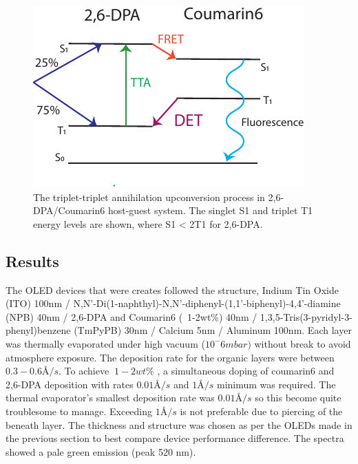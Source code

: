 \documentclass[
  letterpaper,
  DIV=11,
  numbers=noendperiod,
  oneside]{scrreprt}
\begin{document}
\begin{figure}

{\centering \includegraphics{./images/coumarinTTU.pdf}

}

\caption{\label{fig-ttucoumarin}The triplet-triplet annihilation
upconversion process in 2,6-DPA/Coumarin6 host-guest system. The singlet
{S1} and triplet {T1} energy levels are shown, where
{S1 \textless{} 2T1} for 2,6-DPA.}

\end{figure}

\hypertarget{results-1}{%
\subsection{Results}\label{results-1}}

The OLED devices that were creates followed the structure, Indium Tin
Oxide (ITO) 100nm /
N,N'-Di(1-naphthyl)-N,N'-diphenyl-(1,1'-biphenyl)-4,4'-diamine (NPB)
40nm / 2,6-DPA and Coumarin6 (~1-2wt\%) 40nm /
1,3,5-Tris(3-pyridyl-3-phenyl)benzene (TmPyPB) 30nm / Calcium 5nm /
Aluminum 100nm. Each layer was thermally evaporated under high vacuum
(\(10^-6 mbar)\) without break to avoid atmosphere exposure. The
deposition rate for the organic layers were between \(0.3 - 0.6 Å/s\).
To achieve \(~1-2wt\%\) , a simultaneous doping of coumarin6 and 2,6-DPA
deposition with rates \(0.01Å/s\) and \(1Å/s\) minimum was required. The
thermal evaporator's smallest deposition rate was \(0.01Å/s\) so this
become quite troublesome to manage. Exceeding \(1Å/s\) is not preferable
due to piercing of the beneath layer. The thickness and structure was
chosen as per the OLEDs made in the previous section to best compare
device performance difference. The spectra showed a pale green emission
(peak 520 nm).
\end{document}
